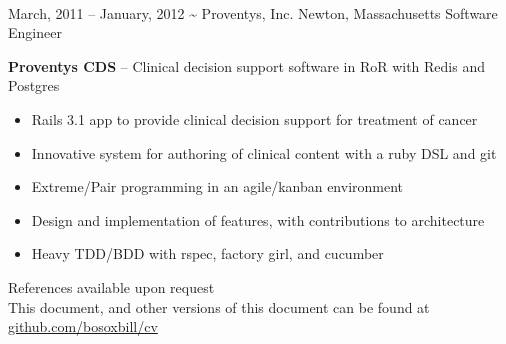 \documentclass[]{friggeri-cv}
\begin{document}
\begin{entrylist}
    \\[1cm]%
    \entryalt
    {March, 2011 -- January, 2012}
    {\textbf{\textasciitilde} Proventys, Inc.}
    {Newton, Massachusetts}
    {Software Engineer}
    {\textbf{Proventys CDS} -- Clinical decision support software in RoR with Redis and Postgres
    \begin{itemize}
      \item Rails 3.1 app to provide clinical decision support for treatment of cancer
      \item Innovative system for authoring of clinical content with a ruby DSL and git
      \item Extreme/Pair programming in an agile/kanban environment
      \item Design and implementation of features, with contributions to architecture
      \item Heavy TDD/BDD with rspec, factory girl, and cucumber
    \end{itemize}}
\end{entrylist} 

\vspace*{\fill}
References available upon request\\
This document, and other versions of this document can be found at \href{http://github.com/bosoxbill/cv/}{github.com/bosoxbill/cv}
\end{document}
